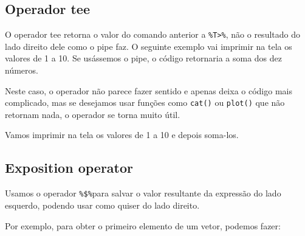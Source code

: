 \documentclass[]{book}
\newenvironment{Shaded}{\begin{snugshade}}{\end{snugshade}}
\newcommand{\CommentTok}[1]{\textcolor[rgb]{0.56,0.35,0.01}{\textit{#1}}}
\newcommand{\DataTypeTok}[1]{\textcolor[rgb]{0.13,0.29,0.53}{#1}}
\newcommand{\DecValTok}[1]{\textcolor[rgb]{0.00,0.00,0.81}{#1}}
\newcommand{\KeywordTok}[1]{\textcolor[rgb]{0.13,0.29,0.53}{\textbf{#1}}}
\newcommand{\NormalTok}[1]{#1}
\newcommand{\OperatorTok}[1]{\textcolor[rgb]{0.81,0.36,0.00}{\textbf{#1}}}
\newcommand{\StringTok}[1]{\textcolor[rgb]{0.31,0.60,0.02}{#1}}
\begin{document}
\hypertarget{operador-tee}{%
\subsection{Operador tee}\label{operador-tee}}

O operador tee retorna o valor do comando anterior a \texttt{\%T\textgreater{}\%}, não o resultado do lado direito dele como o pipe faz. O seguinte exemplo vai imprimir na tela os valores de 1 a 10. Se usássemos o pipe, o código retornaria a soma dos dez números.

\begin{Shaded}
\end{Shaded}

Neste caso, o operador não parece fazer sentido e apenas deixa o código mais complicado, mas se desejamos usar funções como \texttt{cat()} ou \texttt{plot()} que não retornam nada, o operador se torna muito útil.

Vamos imprimir na tela os valores de 1 a 10 e depois soma-los.

\begin{Shaded}
\end{Shaded}

\hypertarget{exposition-operator}{%
\subsection{Exposition operator}\label{exposition-operator}}

Usamos o operador \texttt{\%\$\%}para salvar o valor resultante da expressão do lado esquerdo, podendo usar como quiser do lado direito.

Por exemplo, para obter o primeiro elemento de um vetor, podemos fazer:

\begin{Shaded}
\end{Shaded}
\end{document}
